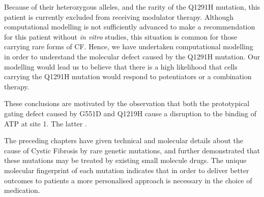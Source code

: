 Because of their heterozygous alleles, and the rarity of the Q1291H mutation, this patient is currently excluded from receiving modulator therapy. Although computational modelling is not sufficiently advanced to make a recommendation for this patient without \textit{in vitro} studies, this situation is common for those carrying rare forms of CF. Hence, we have undertaken computational modelling in order to understand the molecular defect caused by the Q1291H mutation. Our modelling would lead us to believe that there is a high likelihood that cells carrying the Q1291H mutation would respond to potentiators or a combination therapy. 

These conclusions are motivated by the observation that both the prototypical gating defect caused by G551D and Q1219H cause a disruption to the binding of ATP at site 1. The latter .  

The preceding chapters have given technical and molecular details about the cause of Cystic Fibrosis by rare genetic mutations, and further demonstrated that these mutations may be treated by existing small molecule drugs. The unique molecular fingerprint of each mutation indicates that in order to deliver better outcomes to patients a more personalised approach is necessary in the choice of medication. 






